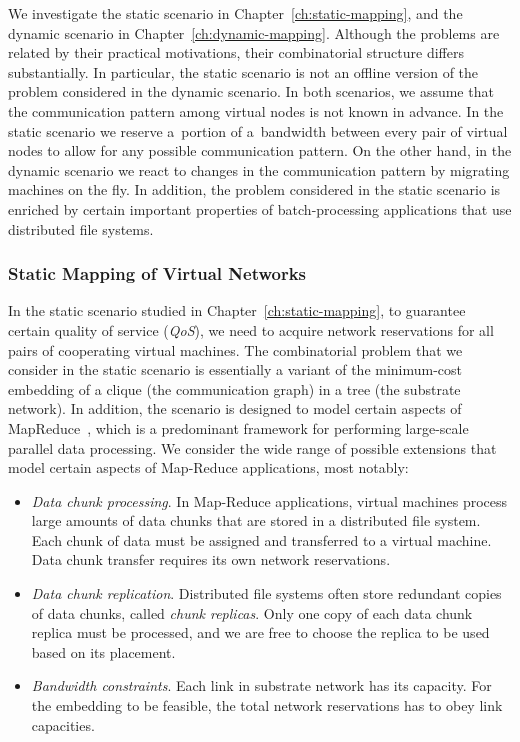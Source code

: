 We investigate the static scenario in Chapter~\ref{ch:static-mapping}, and the dynamic scenario in Chapter~\ref{ch:dynamic-mapping}.
Although the problems are related by their practical motivations, their combinatorial structure differs substantially.
In particular, the static scenario is not an offline version of the problem considered in the dynamic scenario.
In both scenarios, we assume that the communication pattern among virtual nodes is not known in advance.
In the static scenario we reserve a~portion of a~bandwidth between every pair of virtual nodes to allow for any possible communication pattern.
On the other hand, in the dynamic scenario we react to changes in the communication pattern by migrating machines on the fly.
In addition, the problem considered in the static scenario is enriched by certain important properties of batch-processing applications that use distributed file systems.


\subsubsection{Static Mapping of Virtual Networks}
\label{sec:contributions-static-mapping}

In the static scenario studied in Chapter~\ref{ch:static-mapping}, to guarantee certain quality of service (\emph{QoS}), we need to acquire network reservations for all pairs of cooperating virtual machines.
The combinatorial problem that we consider in the static scenario is essentially a variant of the minimum-cost embedding of a clique (the communication graph) in a tree (the substrate network).
In addition, the scenario is designed to model certain aspects of MapReduce~\cite{mapreduce}, which is a predominant framework for performing large-scale parallel data processing.
We consider the wide range of possible extensions that model certain aspects of Map-Reduce applications, most notably:

\begin{itemize}
\item \emph{Data chunk processing}. In Map-Reduce applications, virtual machines process large a\-mounts of data chunks that are stored in a distributed file system. Each chunk of data must be assigned and transferred to a virtual machine. Data chunk transfer requires its own network reservations.

\item \emph{Data chunk replication}. Distributed file systems often store redundant copies of data chunks, called \emph{chunk replicas}. Only one copy of each data chunk replica must be processed, and we are free to choose the replica to be used based on its placement.

\item \emph{Bandwidth constraints}. Each link in substrate network has its capacity. For the embedding to be feasible, the total network reservations has to obey link capacities.
\end{itemize}


